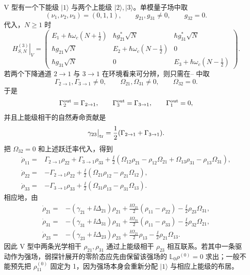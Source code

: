 \clearpage
\begin{exbox}[V 型]
V 型有一个下能级 $|1\rangle$ 与两个上能级 $|2\rangle,|3\rangle$。单模量子场中取
\[
(\nu_1,\nu_2,\nu_3)=(0,1,1),
\qquad
g_{21},g_{31}\ne0,
\qquad
g_{32}=0.
\]
代入，$N\ge1$ 时
\[
\left.H_{S,N}^{(3)}\right|_{V}=
\begin{pmatrix}
E_1+\hbar\omega_c(N+\tfrac12)&\hbar g_{21}^*\sqrt N&\hbar g_{31}^*\sqrt N\\
\hbar g_{21}\sqrt N&E_2+\hbar\omega_c(N-\tfrac12)&0\\
\hbar g_{31}\sqrt N&0&E_3+\hbar\omega_c(N-\tfrac12)
\end{pmatrix}.
\]
若两个下降通道 $2\to1$ 与 $3\to1$ 在环境看来可分辨，则只需在-- 中取
\[
\Gamma_{2\to1},\Gamma_{3\to1}\ne0,
\qquad
\Omega_{21},\Omega_{31}\ne0,
\qquad
\Omega_{32}=0.
\]
于是
\[
\Gamma_2^{\rm out}=\Gamma_{2\to1},
\qquad
\Gamma_3^{\rm out}=\Gamma_{3\to1},
\qquad
\Gamma_1^{\rm out}=0,
\]
并且上能级相干的自然寿命贡献是
\[
\gamma_{23}\big|_{\rm tr}
=\frac12(\Gamma_{2\to1}+\Gamma_{3\to1}).
\]
把 $\Omega_{32}=0$ 和上述跃迁率代入，得到
\begin{align}
\dot\rho_{11}
={}&\Gamma_{2\to1}\rho_{22}+\Gamma_{3\to1}\rho_{33}
+\frac{\ii}{2}
(\Omega_{12}\rho_{21}-\rho_{12}\Omega_{21}
+\Omega_{13}\rho_{31}-\rho_{13}\Omega_{31}),\\
\dot\rho_{22}
={}&-\Gamma_{2\to1}\rho_{22}
+\frac{\ii}{2}(\Omega_{21}\rho_{12}-\rho_{21}\Omega_{12}),\\
\dot\rho_{33}
={}&-\Gamma_{3\to1}\rho_{33}
+\frac{\ii}{2}(\Omega_{31}\rho_{13}-\rho_{31}\Omega_{13}).
\end{align}
相应地，由
\begin{align}
\dot\rho_{21}
={}&-(\gamma_{21}+\ii\Delta_{21})\rho_{21}
+\frac{\ii\Omega_{21}}2(\rho_{11}-\rho_{22})
-\frac{\ii}{2}\rho_{23}\Omega_{31},\\
\dot\rho_{31}
={}&-(\gamma_{31}+\ii\Delta_{31})\rho_{31}
+\frac{\ii\Omega_{31}}2(\rho_{11}-\rho_{33})
-\frac{\ii}{2}\rho_{32}\Omega_{21},\\
\dot\rho_{23}
={}&-(\gamma_{23}+\ii\Delta_{23})\rho_{23}
+\frac{\ii\Omega_{21}}2\rho_{13}
-\frac{\ii}{2}\rho_{21}\Omega_{13}.
\end{align}
因此 V 型中两条光学相干 $\rho_{21},\rho_{31}$ 通过上能级相干 $\rho_{23}$ 相互联系。若其中一条驱动作为强场，弱探针展开的零阶态应先由保留该强场的 $\mathbb L_0\rho^{(0)}=0$ 求出；一般不能预先把 $\rho_{11}^{(0)}$ 固定为 1，因为强场本身会重新分配 $|1\rangle$ 与相应上能级的布居。


\end{exbox}
